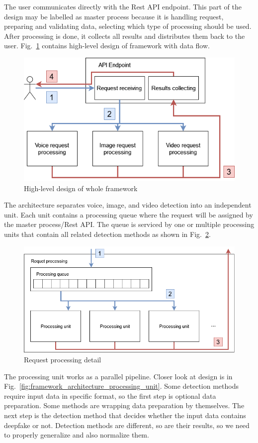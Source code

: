 The user communicates directly with the Rest API endpoint. This part of the design may be labelled as master process because it is handling request, preparing and validating data, selecting which type of processing should be used. After processing is done, it collects all results and distributes them back to the user. Fig.~\ref{fig:framework_architecture} contains high-level design of framework with data flow.

\begin{figure}[H]
    \centering
    \includegraphics[width=.7\linewidth]{other-fig/framework_architecture.png}
    \caption{High-level design of whole framework}
    \label{fig:framework_architecture}
\end{figure}

The architecture separates voice, image, and video detection into an independent unit. Each unit contains a processing queue where the request will be assigned by the master process/Rest API. The queue is serviced by one or multiple processing units that contain all related detection methods as shown in Fig.~\ref{fig:framework_architecture_request_processing}.

\begin{figure}[H]
    \centering
    \includegraphics[width=.65\linewidth]{other-fig/framework_architecture_request_processing.png}
    \caption{Request processing detail}
\label{fig:framework_architecture_request_processing}
\end{figure}

The processing unit works as a parallel pipeline. Closer look at design is in Fig.~\ref{fig:framework_architecture_processing_unit}. Some detection methods require input data in specific format, so the first step is optional data preparation. Some methods are wrapping data preparation by themselves. The next step is the detection method that decides whether the input data contains deepfake or not. Detection methods are different, so are their results, so we need to properly generalize and also normalize them.

